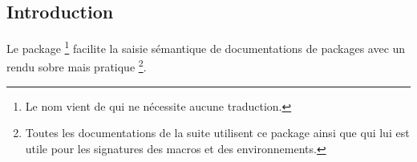 


\usepackage[lang = FR]{../main/main}
\usepackage{../macroenv/macroenv}
\usepackage{../inenglish/inenglish}




\subsection{Introduction}

Le package 
\footnote{
    Le nom vient de  qui ne nécessite aucune traduction.
}
facilite la saisie sémantique de documentations de packages avec un rendu sobre mais pratique
\footnote{
    Toutes les documentations de la suite  utilisent ce package ainsi que  qui lui est utile pour les signatures des macros et des environnements.
}.



